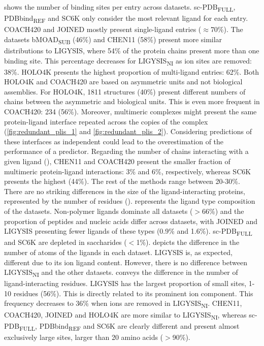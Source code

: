  shows the number of binding sites per entry across datasets. sc-PDB\textsubscript{FULL}, PDBbind\textsubscript{REF} and SC6K only consider the most relevant ligand for each entry. COACH420 and JOINED mostly present single-ligand entries ($\approx$70\%). The datasets bMOAD\textsubscript{SUB} (46\%) and CHEN11 (58\%) present more similar distributions to LIGYSIS, where 54\% of the protein chains present more than one binding site. This percentage decreases for LIGYSIS\textsubscript{NI} as ion sites are removed: 38\%. HOLO4K presents the highest proportion of multi-ligand entries: 62\%. Both HOLO4K and COACH420 are based on asymmetric units and not biological assemblies. For HOLO4K, 1811 structures (40\%) present different numbers of chains between the asymmetric and biological units. This is even more frequent in COACH420: 234 (56\%). Moreover, multimeric complexes might present the same protein-ligand interface repeated across the copies of the complex (\autoref{fig:redundant_plis_1} and \autoref{fig:redundant_plis_2}). Considering predictions of these interfaces as independent could lead to the overestimation of the performance of a predictor. Regarding the number of chains interacting with a given ligand (), CHEN11 and COACH420 present the smaller fraction of multimeric protein-ligand interactions: 3\% and 6\%, respectively, whereas SC6K presents the highest (44\%). The rest of the methods range between 20-30\%. There are no striking differences in the size of the ligand-interacting proteins, represented by the number of residues ().  represents the ligand type composition of the datasets. Non-polymer ligands dominate all datasets ($>$66\%) and the proportion of peptides and nucleic acids differ across datasets, with JOINED and LIGYSIS presenting fewer ligands of these types (0.9\% and 1.6\%). sc-PDB\textsubscript{FULL} and SC6K are depleted in saccharides ($<$1\%).  depicts the difference in the number of atoms of the ligands in each dataset. LIGYSIS is, as expected, different due to its ion ligand content. However, there is no difference between LIGYSIS\textsubscript{NI} and the other datasets.  conveys the difference in the number of ligand-interacting residues. LIGYSIS has the largest proportion of small sites, 1-10 residues (56\%). This is directly related to its prominent ion component. This frequency decreases to 36\% when ions are removed in LIGYSIS\textsubscript{NI}. CHEN11, COACH420, JOINED and HOLO4K are more similar to LIGYSIS\textsubscript{NI}, whereas sc-PDB\textsubscript{FULL}, PDBbind\textsubscript{REF} and SC6K are clearly different and present almost exclusively large sites, larger than 20 amino acids ($>$90\%).

